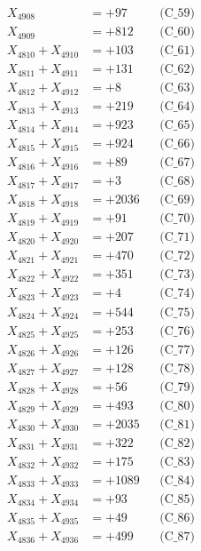 \documentclass[a4paper,10pt]{article}
\begin{document}
{\begin{align}
X_{4908} &= +97 && \text{(C\_59)} \\
X_{4909} &= +812 && \text{(C\_60)} \\
\allowbreak
X_{4810} + X_{4910} &= +103 && \text{(C\_61)} \\
X_{4811} + X_{4911} &= +131 && \text{(C\_62)} \\
X_{4812} + X_{4912} &= +8 && \text{(C\_63)} \\
X_{4813} + X_{4913} &= +219 && \text{(C\_64)} \\
X_{4814} + X_{4914} &= +923 && \text{(C\_65)} \\
\allowbreak
X_{4815} + X_{4915} &= +924 && \text{(C\_66)} \\
X_{4816} + X_{4916} &= +89 && \text{(C\_67)} \\
X_{4817} + X_{4917} &= +3 && \text{(C\_68)} \\
X_{4818} + X_{4918} &= +2036 && \text{(C\_69)} \\
X_{4819} + X_{4919} &= +91 && \text{(C\_70)} \\
\allowbreak
X_{4820} + X_{4920} &= +207 && \text{(C\_71)} \\
X_{4821} + X_{4921} &= +470 && \text{(C\_72)} \\
X_{4822} + X_{4922} &= +351 && \text{(C\_73)} \\
X_{4823} + X_{4923} &= +4 && \text{(C\_74)} \\
X_{4824} + X_{4924} &= +544 && \text{(C\_75)} \\
\allowbreak
X_{4825} + X_{4925} &= +253 && \text{(C\_76)} \\
X_{4826} + X_{4926} &= +126 && \text{(C\_77)} \\
X_{4827} + X_{4927} &= +128 && \text{(C\_78)} \\
X_{4828} + X_{4928} &= +56 && \text{(C\_79)} \\
X_{4829} + X_{4929} &= +493 && \text{(C\_80)} \\
\allowbreak
X_{4830} + X_{4930} &= +2035 && \text{(C\_81)} \\
X_{4831} + X_{4931} &= +322 && \text{(C\_82)} \\
X_{4832} + X_{4932} &= +175 && \text{(C\_83)} \\
X_{4833} + X_{4933} &= +1089 && \text{(C\_84)} \\
X_{4834} + X_{4934} &= +93 && \text{(C\_85)} \\
\allowbreak
X_{4835} + X_{4935} &= +49 && \text{(C\_86)} \\
X_{4836} + X_{4936} &= +499 && \text{(C\_87)} \\

\end{align}}
\end{document}
